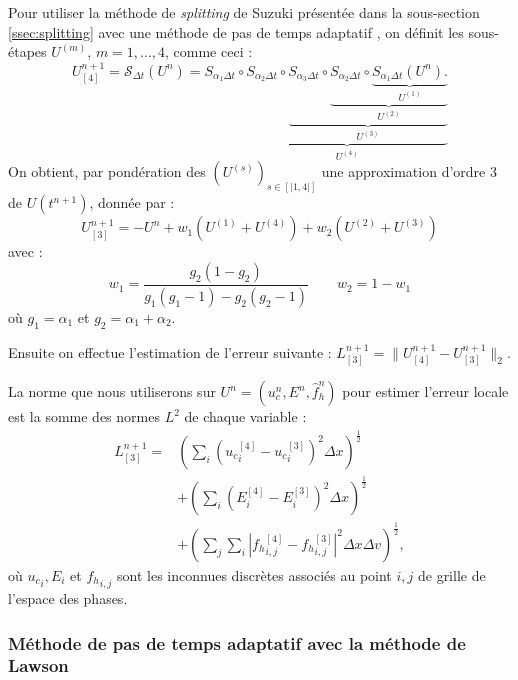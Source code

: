 Pour utiliser la méthode de \emph{splitting} de Suzuki présentée dans la sous-section \ref{ssec:splitting} avec une méthode de pas de temps adaptatif \cite{Blanes:2019}, on définit les sous-étapes $U^{(m)}$, $m=1,\dots,4$, comme ceci :
$$
  U^{n+1}_{[4]} = \mathcal{S}_{\Delta t}(U^n)
    = S_{\alpha_1\Delta t}
      \circ \underbrace{ S_{\alpha_2\Delta t}
      \circ \underbrace{ S_{\alpha_3\Delta t}
      \circ \underbrace{ S_{\alpha_2\Delta t}
      \circ \underbrace{ S_{\alpha_1\Delta t} (U^n). }_{U^{(1)}}
                                                    }_{U^{(2)}}
                                                    }_{U^{(3)}}
                                                    }_{U^{(4)}}
$$
On obtient, par pondération des $\left(U^{(s)}\right)_{s\in [\!|1,4|\!] }$ une  approximation d'ordre $3$ de $U(t^{n+1})$, donnée par :
$$
  U^{n+1}_{[3]} = -U^n + w_1(U^{(1)} + U^{(4)}) + w_2(U^{(2)} + U^{(3)})
$$
avec :
$$
  w_1 = \frac{g_2(1-g_2)}{g_1(g_1-1)-g_2(g_2-1)} \qquad w_2 = 1-w_1
$$
où $g_1 = \alpha_1$ et $g_2 = \alpha_1 + \alpha_2$.

Ensuite on effectue l'estimation de l'erreur suivante : $L^{n+1}_{[3]} = \| U^{n+1}_{[4]}-U^{n+1}_{[3]} \|_2$.

La norme que nous utiliserons sur $U^n = (u_c^n,E^n,\hat{f}_h^n)$ pour estimer l'erreur locale est la somme des normes $L^2$ de chaque variable :
\begin{equation}
  \begin{aligned}
  L^{n+1}_{[3]} = & \left(\sum_i (\left.u_c\right.^{[4]}_i-\left.u_c\right.^{[3]}_i)^2\Delta x\right)^{\frac{1}{2}} \\
                & + \left(\sum_i (\left.E\right.^{[4]}_i-\left.E\right.^{[3]}_i)^2\Delta x\right)^{\frac{1}{2}}     \\
                & + \left(\sum_j \sum_i \left|\left.f_h\right.^{[4]}_{i,j}-\left.f_h\right.^{[3]}_{i,j}\right|^2\Delta x\Delta v\right)^{\frac{1}{2}}, 
  \end{aligned}
  \label{local_error}
\end{equation}
où $\left.u_c\right._i, \left.E\right._i$ et $\left.f_h\right._{i,j}$ sont les inconnues discrètes associés au point $i,j$ de grille de l'espace des phases.


\subsubsection{Méthode de pas de temps adaptatif avec la méthode de Lawson}

